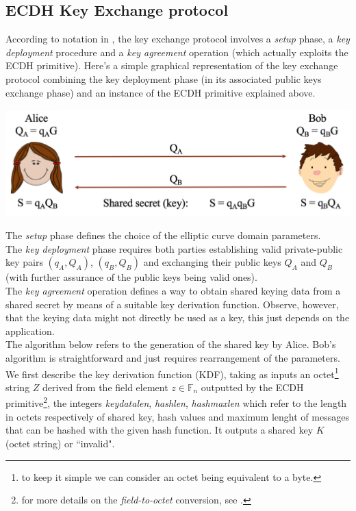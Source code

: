 \subsection{ECDH Key Exchange protocol}
According to notation in \cite{Sec}, the key exchange protocol involves a \textit{setup} phase, a \textit{key deployment} procedure and a \textit{key agreement} operation (which actually exploits the ECDH primitive).
Here's a simple graphical representation of the key exchange protocol combining the key deployment phase (in its associated public keys exchange phase) and an instance of the ECDH primitive explained above.
\begin{center}
	\includegraphics[scale = 0.55]{Images/ECDH.png}
	\label{fig:ECDH}
\end{center}
The \textit{setup} phase defines the choice of the elliptic curve domain parameters.\\
The \textit{key deployment} phase requires both parties establishing valid private-public key pairs $(q_A,Q_A)$, $(q_B,Q_B)$ and exchanging their public keys $Q_A$ and $Q_B$ (with further assurance of the public keys being valid ones).\\
The \textit{key agreement} operation defines a way to obtain shared keying data from a shared secret by means of a suitable key derivation function. Observe, however, that the keying data might not directly be used as a key, this just depends on the application.\\ The algorithm below refers to the generation of the shared key by Alice. Bob's algorithm is straightforward and just requires rearrangement of the parameters. We first describe the key derivation function (KDF), taking as inputs an octet\footnote{to keep it simple we can consider an octet being equivalent to a byte.} string $Z$ derived from the field element $z \in \mathbb{F}_n$ outputted by the ECDH primitive\footnote{for more details on the \textit{field-to-octet} conversion, see \cite{Sec}.}, the integers \textit{keydatalen}, \textit{hashlen}, \textit{hashmaxlen} which refer to the length in octets respectively of shared key, hash values and maximum lenght of messages that can be hashed with the given hash function. It outputs a shared key $K$ (octet string) or ``invalid". 
